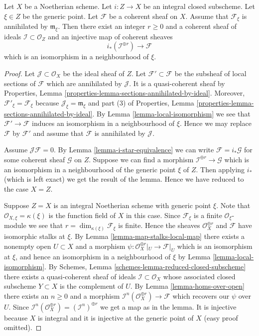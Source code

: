 \begin{lemma}
\label{lemma-prepare-filter-irreducible}
Let $X$ be a Noetherian scheme.
Let $i : Z \to X$ be an integral closed subscheme.
Let $\xi \in Z$ be the generic point.
Let $\mathcal{F}$ be a coherent sheaf on $X$.
Assume that $\mathcal{F}_\xi$ is annihilated by
$\mathfrak m_\xi$. Then there exist an integer
$r \geq 0$ and a coherent sheaf of ideals $\mathcal{I} \subset \mathcal{O}_Z$
and an injective map of coherent sheaves
$$
i_*\left(\mathcal{I}^{\oplus r}\right) \to \mathcal{F}
$$
which is an isomorphism in a neighbourhood of $\xi$.
\end{lemma}

\begin{proof}
Let $\mathcal{J} \subset \mathcal{O}_X$ be the ideal sheaf of $Z$.
Let $\mathcal{F}' \subset \mathcal{F}$ be the subsheaf of
local sections of $\mathcal{F}$ which are annihilated by
$\mathcal{J}$. It is a quasi-coherent sheaf by
Properties, Lemma \ref{properties-lemma-sections-annihilated-by-ideal}.
Moreover, $\mathcal{F}'_\xi = \mathcal{F}_\xi$ because
$\mathcal{J}_\xi = \mathfrak m_\xi$ and part (3) of
Properties, Lemma \ref{properties-lemma-sections-annihilated-by-ideal}.
By Lemma \ref{lemma-local-isomorphism} we see that
$\mathcal{F}' \to \mathcal{F}$
induces an isomorphism in a neighbourhood of $\xi$.
Hence we may replace $\mathcal{F}$ by $\mathcal{F}'$ and assume
that $\mathcal{F}$ is annihilated by $\mathcal{J}$.

\medskip\noindent
Assume $\mathcal{J}\mathcal{F} = 0$. By
Lemma \ref{lemma-i-star-equivalence} we can write
$\mathcal{F} = i_*\mathcal{G}$ for some coherent
sheaf $\mathcal{G}$ on $Z$. Suppose we can find a morphism
$\mathcal{I}^{\oplus r} \to \mathcal{G}$ which is an isomorphism
in a neighbourhood of the generic point $\xi$ of $Z$.
Then applying $i_*$ (which is left exact) we get the result of the lemma.
Hence we have reduced to the case $X = Z$.

\medskip\noindent
Suppose $Z = X$ is an integral Noetherian scheme with generic point $\xi$.
Note that $\mathcal{O}_{X, \xi} = \kappa(\xi)$ is the function field of $X$
in this case.
Since $\mathcal{F}_\xi$ is a finite $\mathcal{O}_\xi$-module we see
that $r = \dim_{\kappa(\xi)} \mathcal{F}_\xi$ is finite.
Hence the sheaves $\mathcal{O}_X^{\oplus r}$ and $\mathcal{F}$
have isomorphic stalks at $\xi$.
By Lemma \ref{lemma-map-stalks-local-map} there exists a nonempty
open $U \subset X$ and a morphism
$\psi : \mathcal{O}_X^{\oplus r}|_U \to \mathcal{F}|_U$
which is an isomorphism
at $\xi$, and hence an isomorphism in a neighbourhood of $\xi$ by
Lemma \ref{lemma-local-isomorphism}.
By Schemes, Lemma \ref{schemes-lemma-reduced-closed-subscheme}
there exists a quasi-coherent sheaf of ideals
$\mathcal{I} \subset \mathcal{O}_X$
whose associated closed subscheme $Y \subset X$ is the complement
of $U$.
By Lemma \ref{lemma-homs-over-open} there exists an $n \geq 0$ and a morphism
$\mathcal{I}^n(\mathcal{O}_X^{\oplus r}) \to \mathcal{F}$
which recovers our $\psi$ over $U$. Since
$\mathcal{I}^n(\mathcal{O}_X^{\oplus r}) = (\mathcal{I}^n)^{\oplus r}$
we get a map as in the lemma. It is injective because $X$ is
integral and it is injective at the generic point of $X$
(easy proof omitted).
\end{proof}

